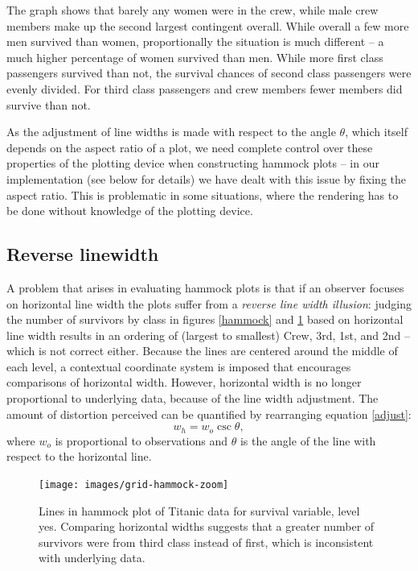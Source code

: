 The graph shows that barely any women were in the crew, while male crew members make up the second largest contingent overall. While overall a few more men survived than women, proportionally the situation is much different -- a much higher percentage of women survived than men. While more first class passengers survived than not, the  survival chances of second class passengers were evenly divided. For third class passengers and crew members fewer members did  survive than not. 

As the adjustment of line widths is made with respect to the angle $\theta$, which itself depends on the aspect ratio of a plot, we need complete control over these properties of the plotting device when constructing hammock plots  -- in our implementation (see below for details) we have dealt with this issue by fixing the aspect ratio. This is problematic in some situations, where the rendering has to be done without knowledge of the plotting device. 



\subsection{Reverse linewidth}
A problem that arises in evaluating hammock plots is that if an observer focuses on horizontal line width  the plots suffer from a {\it reverse line width illusion}:  judging the number of survivors by class in figures \ref{hammock} and \ref{hammock_zoom} based on horizontal line width  results in an ordering of (largest to smallest) Crew, 3rd, 1st, and 2nd -- which is not correct either. %
Because the lines are centered around the middle of each level, a contextual coordinate system is imposed that encourages comparisons of horizontal width. However, horizontal width is no longer proportional to underlying data, because of the line width adjustment.  
The amount of distortion perceived can be quantified by rearranging equation \ref{adjust}:
\begin{equation}\label{rev}
w_h = w_o \csc \theta,
\end{equation}
 where $w_o$ is proportional to observations and $\theta$ is the angle of the line with respect to the horizontal line.

\begin{figure}[htbp]
\centering
\texttt{[image: images/grid-hammock-zoom]}
\caption{\label{hammock_zoom}Lines in hammock plot of Titanic data for survival variable, level yes. Comparing horizontal widths suggests that a greater number of survivors were from third class instead of first, which is inconsistent with underlying data.}
\end{figure}


